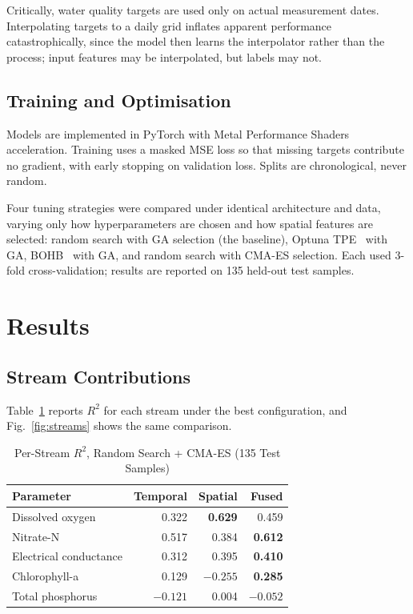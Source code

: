 \documentclass[conference]{IEEEtran}
\begin{document}
Critically, water quality targets are used only on actual measurement dates.
Interpolating targets to a daily grid inflates apparent performance
catastrophically, since the model then learns the interpolator rather than the
process; input features may be interpolated, but labels may not.

\subsection{Training and Optimisation}

Models are implemented in PyTorch with Metal Performance Shaders acceleration.
Training uses a masked MSE loss so that missing targets contribute no gradient,
with early stopping on validation loss. Splits are chronological, never random.

Four tuning strategies were compared under identical architecture and data,
varying only how hyperparameters are chosen and how spatial features are
selected: random search with GA selection (the baseline), Optuna
TPE~\cite{akiba} with GA, BOHB~\cite{falkner} with GA, and random search with
CMA-ES selection. Each used 3-fold cross-validation; results are reported on
135 held-out test samples.

\section{Results}

\subsection{Stream Contributions}

Table~\ref{tab:streams} reports $R^2$ for each stream under the best
configuration, and Fig.~\ref{fig:streams} shows the same comparison.

\begin{table}[!t]
\caption{Per-Stream $R^2$, Random Search + CMA-ES (135 Test Samples)}
\label{tab:streams}
\centering
\small
\setlength{\tabcolsep}{4pt}
\begin{tabular}{lrrr}
\toprule
\textbf{Parameter} & \textbf{Temporal} & \textbf{Spatial} & \textbf{Fused} \\
\midrule
Dissolved oxygen        & 0.322 & \textbf{0.629} & 0.459 \\
Nitrate-N               & 0.517 & 0.384 & \textbf{0.612} \\
Electrical conductance  & 0.312 & 0.395 & \textbf{0.410} \\
Chlorophyll-a           & 0.129 & $-0.255$ & \textbf{0.285} \\
Total phosphorus        & $-0.121$ & 0.004 & $-0.052$ \\
\bottomrule
\end{tabular}
\end{table}
\end{document}
